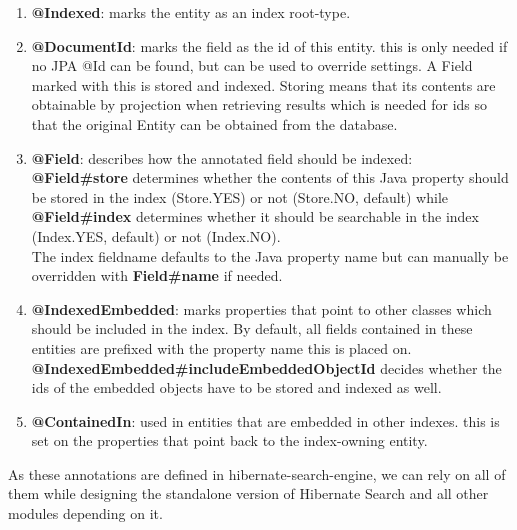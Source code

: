 \begin{enumerate}
	\item \textbf{@Indexed}: marks the entity as an index root-type.
	\item \textbf{@DocumentId}: marks the field as the id of this entity. this is only needed if no JPA @Id can be found, but can be used to override settings. A Field marked with this
	is stored and indexed. Storing means that its contents are obtainable by projection when retrieving results which is needed for ids so that the original Entity can be obtained from the database.
	\item \textbf{@Field}: describes how the annotated field should be indexed:
	\\\textbf{@Field\#store} determines whether the contents of this Java property should be stored in the index (Store.YES) or not (Store.NO, default) while \textbf{@Field\#index} determines whether it should be searchable in the index (Index.YES, default) or not (Index.NO). 
	\\
	The index fieldname defaults to the Java property name but can manually be overridden with \textbf{Field\#name} if needed.
	\item \textbf{@IndexedEmbedded}: marks properties that point to other classes which should be included in the index. By default, all fields contained in these entities are prefixed with the property name this is placed on. \\
	\textbf{@IndexedEmbedded\#includeEmbeddedObjectId} decides whether the ids of the embedded objects have to be stored and indexed as well.
	\item \textbf{@ContainedIn}: used in entities that are embedded in other indexes. this is set on the properties that point back to the index-owning entity.
\end{enumerate}
\noindent
As these annotations are defined in hibernate-search-engine, we can rely on all of them while designing the standalone version of Hibernate Search and all other modules depending on it.

